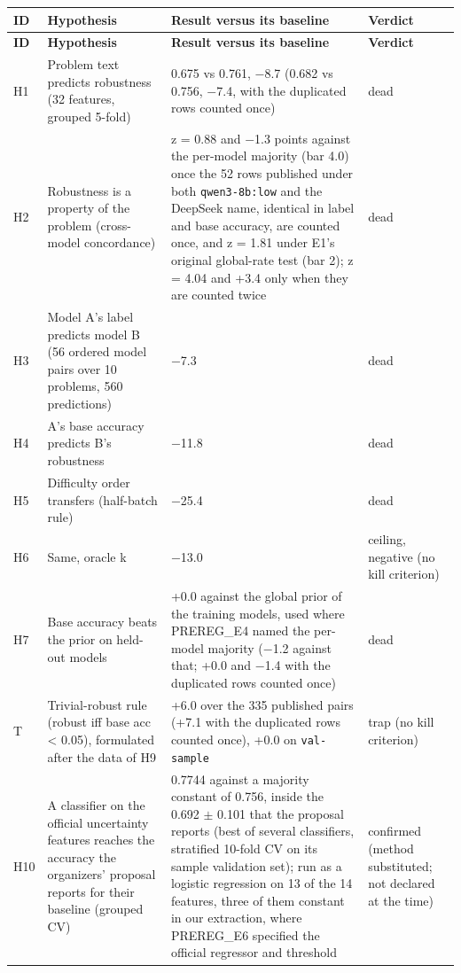 {\footnotesize\setlength{\tabcolsep}{4pt}
\begin{longtable}{L{1.1cm}L{3.7cm}L{5.7cm}L{2.2cm}}
\toprule
\textbf{ID} & \textbf{Hypothesis} & \textbf{Result versus its baseline} & \textbf{Verdict} \\
\midrule
\endfirsthead
\toprule
\textbf{ID} & \textbf{Hypothesis} & \textbf{Result versus its baseline} & \textbf{Verdict} \\
\midrule
\endhead
\midrule
\endfoot
\bottomrule
\endlastfoot
H1 & Problem text predicts robustness (32 features, grouped 5-fold) & 0.675 vs 0.761, $-$8.7 (0.682 vs 0.756, $-$7.4, with the duplicated rows counted once) & dead \\
H2 & Robustness is a property of the problem (cross-model concordance) & z = 0.88 and $-$1.3 points against the per-model majority (bar 4.0) once the 52 rows published under both \texttt{qwen3-8b:low} and the DeepSeek name, identical in label and base accuracy, are counted once, and z = 1.81 under E1's original global-rate test (bar 2); z = 4.04 and +3.4 only when they are counted twice & dead \\
H3 & Model A's label predicts model B (56 ordered model pairs over 10 problems, 560 predictions) & $-$7.3 & dead \\
H4 & A's base accuracy predicts B's robustness & $-$11.8 & dead \\
H5 & Difficulty order transfers (half-batch rule) & $-$25.4 & dead \\
H6 & Same, oracle k & $-$13.0 & ceiling, negative (no kill criterion) \\
H7 & Base accuracy beats the prior on held-out models & +0.0 against the global prior of the training models, used where PREREG\_E4 named the per-model majority ($-$1.2 against that; +0.0 and $-$1.4 with the duplicated rows counted once) & dead \\
T & Trivial-robust rule (robust iff base acc < 0.05), formulated after the data of H9 & +6.0 over the 335 published pairs (+7.1 with the duplicated rows counted once), +0.0 on \texttt{val-sample} & trap (no kill criterion) \\
H10 & A classifier on the official uncertainty features reaches the accuracy the organizers' proposal reports for their baseline (grouped CV) & 0.7744 against a majority constant of 0.756, inside the 0.692 $\pm$ 0.101 that the proposal reports (best of several classifiers, stratified 10-fold CV on its sample validation set); run as a logistic regression on 13 of the 14 features, three of them constant in our extraction, where PREREG\_E6 specified the official regressor and threshold & confirmed (method substituted; not declared at the time) \\

\end{longtable}}
